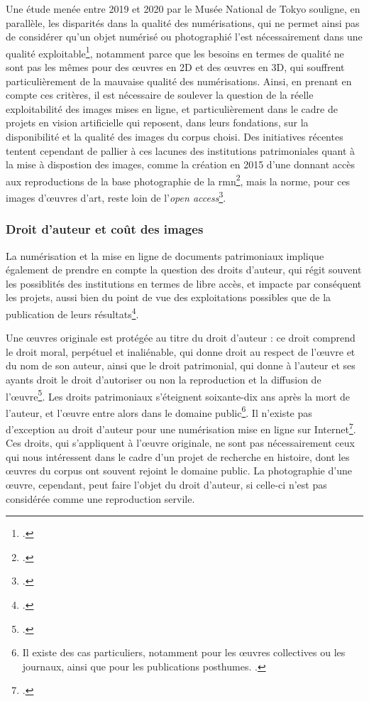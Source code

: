 Une étude menée entre 2019 et 2020 par le Musée National de Tokyo souligne, en parallèle, les disparités dans la qualité des numérisations, qui ne permet ainsi pas de considérer qu'un objet numérisé ou photographié l'est nécessairement dans une qualité exploitable\footcite{sakaiDigitizingDisparityMuseum2021}, notamment parce que les besoins en termes de qualité ne sont pas les mêmes pour des œuvres en 2D et des œuvres en 3D, qui souffrent particulièrement de la mauvaise qualité des numérisations. Ainsi, en prenant en compte ces critères, il est nécessaire de soulever la question de la réelle exploitabilité des images mises en ligne, et particulièrement dans le cadre de projets en vision artificielle qui reposent, dans leurs fondations, sur la disponibilité et la qualité des images du corpus choisi. Des initiatives récentes tentent cependant de pallier à ces lacunes des institutions patrimoniales quant à la mise à dispostion des images, comme la création en 2015 d'une \api donnant accès aux reproductions de la base photographie de la \acrshort{rmn}\footcite{APIRMNGrandPalais}, mais la norme, pour ces images d'œuvres d'art, reste loin de l'\textit{open access}\footcite{mancaNouveauxDefisAgences2018}. 

        \subsubsection{Droit d'auteur et coût des images}
La numérisation et la mise en ligne de documents patrimoniaux implique également de prendre en compte la question des droits d'auteur, qui régit souvent les possiblités des institutions en termes de libre accès, et impacte par conséquent les projets, aussi bien du point de vue des exploitations possibles que de la publication de leurs résultats\footcite{jacquotDecrireTranscrireDiffuser2017}. 

Une œuvres originale est protégée au titre du droit d'auteur : ce droit comprend le droit moral, perpétuel et inaliénable, qui donne droit au respect de l'œuvre et du nom de son auteur, ainsi que le droit patrimonial, qui donne à l'auteur et ses ayants droit le droit d'autoriser ou non la reproduction et la diffusion de l'œuvre\footcite{sepetjanRespecterDroitPropriete2017}. Les droits patrimoniaux s'éteignent soixante-dix ans après la mort de l'auteur, et l'œuvre entre alors dans le domaine public\footnote{Il existe des cas particuliers, notamment pour les œuvres collectives ou les journaux, ainsi que pour les publications posthumes. \cite{GuidePratiquePour}.}. Il n'existe pas d'exception au droit d'auteur pour une numérisation mise en ligne sur Internet\footcite{sepetjanRespecterDroitPropriete2017}. Ces droits, qui s'appliquent à l'œuvre originale, ne sont pas nécessairement ceux qui nous intéressent dans le cadre d'un projet de recherche en histoire, dont les œuvres du corpus ont souvent rejoint le domaine public. La photographie d'une œuvre, cependant, peut faire l'objet du droit d'auteur, si celle-ci n'est pas considérée comme une reproduction servile.

